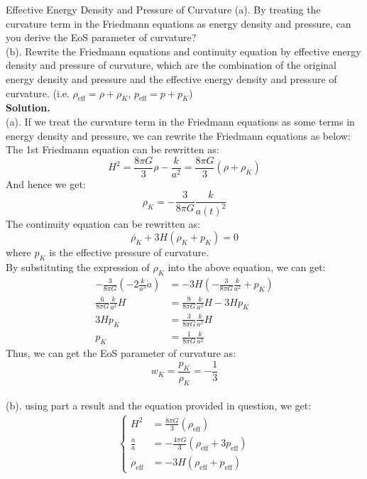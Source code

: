 \clearpage
\begin{example}{Effective Energy Density and Pressure of Curvature}{}
    (a). By treating the curvature term in the Friedmann equations as energy density and pressure, can you derive the EoS parameter of curvature? \\
    (b). Rewrite the Friedmann equations and continuity equation by effective energy density and pressure of curvature, which are the combination of the original energy density and pressure and the effective energy density and pressure of curvature. (i.e. $\rho_{\text{eff}} = \rho + \rho_K$, $p_{\text{eff}} = p + p_K$) \\
    
    \bigskip\textbf{Solution.}\quad \\
    (a). If we treat the curvature term in the Friedmann equations as some terms in energy density and pressure, we can rewrite the Friedmann equations as below: \\
    The 1st Friedmann equation can be rewritten as:
    \[
        H^2 = \frac{8\pi G}{3}\rho - \frac{k}{a^2} = \frac{8\pi G}{3}(\rho + \rho_K)
    \]
    And hence we get:
    \[
        \rho_K = -\frac{3}{8\pi G} \frac{k}{a(t)^2}
    \]
    The continuity equation can be rewritten as:
    \[
        \dot{\rho_K} + 3H(\rho_K + p_K) = 0
    \]
    where $p_K$ is the effective pressure of curvature. \\

    By substituting the expression of $\rho_K$ into the above equation, we can get:
    \begin{align*}
       -\frac{3}{8\pi G} \left( -2\frac{k}{a^3}\dot{a} \right) &= -3H \left( -\frac{3}{8\pi G} \frac{k}{a^2} + p_K \right)\\
        \frac{6}{8\pi G} \frac{k}{a^2} H &= \frac{9}{8\pi G} \frac{k}{a^2} H - 3H p_K \\
        3H p_K &= \frac{3}{8\pi G} \frac{k}{a^2} H \\
        p_K &= \frac{1}{8\pi G} \frac{k}{a^2}
    \end{align*}
    Thus, we can get the EoS parameter of curvature as:
    \[
        w_K = \frac{p_K}{\rho_K} = -\frac{1}{3} 
    \] \\

    (b). using part a result and the equation provided in question, we get:
    \begin{align*}
        \begin{cases}
            H^2 &= \frac{8\pi G}{3}(\rho_{\text{eff}}) \\
            \frac{\ddot{a}}{a} &= -\frac{4\pi G}{3}(\rho_{\text{eff}} + 3p_{\text{eff}}) \\
            \dot{\rho}_{\text{eff}} &= - 3H(\rho_{\text{eff}} + p_{\text{eff}})
        \end{cases}
    \end{align*}
\end{example}

